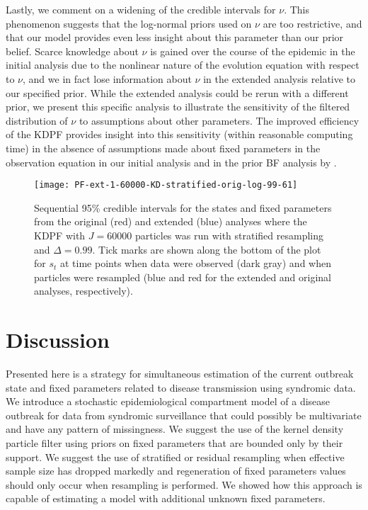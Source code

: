 \documentclass{elsarticle}
\begin{document}
Lastly, we comment on a widening of the credible intervals for $\nu$. This phenomenon suggests that the log-normal priors used on $\nu$ are too restrictive, and that our model provides even less insight about this parameter than our prior belief. Scarce knowledge about $\nu$ is gained over the course of the epidemic in the initial analysis due to the nonlinear nature of the evolution equation with respect to $\nu$, and we in fact lose information about $\nu$ in the extended analysis relative to our specified prior. While the extended analysis could be rerun with a different prior, we present this specific analysis to illustrate the sensitivity of the filtered distribution of $\nu$ to assumptions about other parameters. The improved efficiency of the KDPF provides insight into this sensitivity (within reasonable computing time) in the absence of assumptions made about fixed parameters in the observation equation in our initial analysis and in the prior BF analysis by \citet{skvortsov2012monitoring}.

\begin{figure}
\centering
\texttt{[image: PF-ext-1-60000-KD-stratified-orig-log-99-61]}
\caption{Sequential 95\% credible intervals for the states and fixed parameters from the original (red) and extended (blue) analyses where the KDPF with $J = 60000$ particles was run with stratified resampling and $\Delta = 0.99$. Tick marks are shown along the bottom of the plot for $s_t$ at time points when data were observed (dark gray) and when particles were resampled (blue and red for the extended and original analyses, respectively).} \label{fig:ext}
\end{figure}

\section{Discussion \label{sec:discussion}}

Presented here is a strategy for simultaneous estimation of the current outbreak state and fixed parameters related to disease transmission using syndromic data. We introduce a stochastic epidemiological compartment model of a disease outbreak for data from syndromic surveillance that could possibly be multivariate and have any pattern of missingness. We suggest the use of the kernel density particle filter \citep{Liu:West:comb:2001} using priors on fixed parameters that are bounded only by their support. We suggest the use of stratified or residual resampling when effective sample size has dropped markedly and regeneration of fixed parameters values should only occur when resampling is performed. We showed how this approach is capable of estimating a model with additional unknown fixed parameters.
\end{document}
